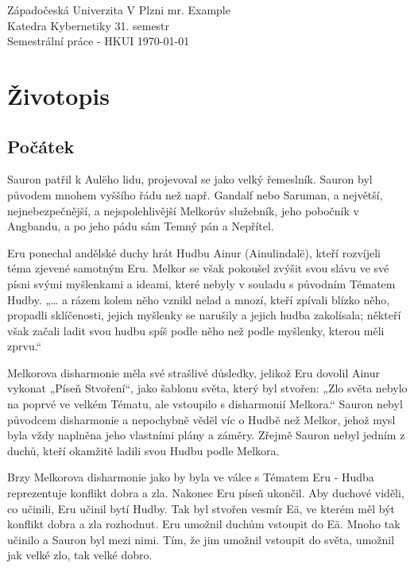 \documentclass[12pt]{article} %
\begin{document}
\vfill{}  %
\noindent  %
Západočeská Univerzita V Plzni \hfill mr. Example\\  %
Katedra Kybernetiky \hfill 31. semestr\\
Semestrální práce - HKUI \hfill \today %
\thispagestyle{empty}  %
\newpage %
\setcounter{page}{1} %

\section{Životopis} 
\subsection{Počátek}
Sauron patřil k Aulëho lidu, projevoval se jako velký řemeslník. Sauron byl původem mnohem vyššího řádu než např. Gandalf nebo Saruman, a největší, nejnebezpečnější, a nejspolehlivější Melkorův služebník, jeho pobočník v Angbandu, a po jeho pádu sám Temný pán a Nepřítel.

Eru ponechal andělské duchy hrát Hudbu Ainur (Ainulindalë), kteří rozvíjeli téma zjevené samotným Eru. Melkor se však pokoušel zvýšit svou slávu ve své písni svými myšlenkami a ideami, které nebyly v souladu s původním Tématem Hudby. „… a rázem kolem něho vznikl nelad a mnozí, kteří zpívali blízko něho, propadli sklíčenosti, jejich myšlenky se narušily a jejich hudba zakolísala; někteří však začali ladit svou hudbu spíš podle něho než podle myšlenky, kterou měli zprvu.“

Melkorova disharmonie měla své strašlivé důsledky, jelikož Eru dovolil Ainur vykonat „Píseň Stvoření“, jako šablonu světa, který byl stvořen: „Zlo světa nebylo na poprvé ve velkém Tématu, ale vstoupilo s disharmonií Melkora.“ Sauron nebyl původcem disharmonie a nepochybně věděl víc o Hudbě než Melkor, jehož mysl byla vždy naplněna jeho vlastními plány a záměry. Zřejmě Sauron nebyl jedním z duchů, kteří okamžitě ladili svou Hudbu podle Melkora.

Brzy Melkorova disharmonie jako by byla ve válce s Tématem Eru - Hudba reprezentuje konflikt dobra a zla. Nakonec Eru píseň ukončil. Aby duchové viděli, co učinili, Eru učinil bytí Hudby. Tak byl stvořen vesmír Eä, ve kterém měl být konflikt dobra a zla rozhodnut. Eru umožnil duchům vstoupit do Eä. Mnoho tak učinilo a Sauron byl mezi nimi. Tím, že jim umožnil vstoupit do světa, umožnil jak velké zlo, tak velké dobro. 
\end{document}
